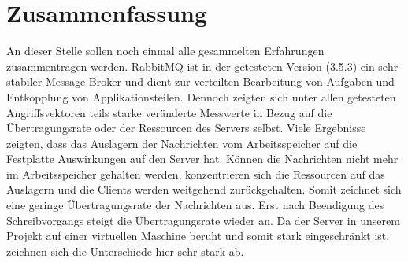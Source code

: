 \documentclass[	a4paper,
			11pt,
			oneside,
			parskip]{scrartcl}
\begin{document}
\clearpage
\section*{Zusammenfassung}

	An dieser Stelle sollen noch einmal alle gesammelten Erfahrungen zusammentragen werden. RabbitMQ ist in der getesteten Version (3.5.3) ein sehr stabiler Message-Broker und dient zur verteilten Bearbeitung von Aufgaben und Entkopplung von Applikationsteilen. Dennoch zeigten sich unter allen getesteten Angriffsvektoren teils starke veränderte Messwerte in Bezug auf die Übertragungsrate oder der Ressourcen des Servers selbst. Viele Ergebnisse zeigten, dass das Auslagern der Nachrichten vom Arbeitsspeicher auf die Festplatte Auswirkungen auf den Server hat. Können die Nachrichten nicht mehr im Arbeitsspeicher gehalten werden, konzentrieren sich die Ressourcen auf das Auslagern und die Clients werden weitgehend zurückgehalten. Somit zeichnet sich eine geringe Übertragungsrate der Nachrichten aus. Erst nach Beendigung des Schreibvorgangs steigt die Übertragungsrate wieder an. Da der Server in unserem Projekt auf einer virtuellen Maschine beruht und somit stark eingeschränkt ist, zeichnen sich die Unterschiede hier sehr stark ab.
\end{document}
